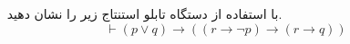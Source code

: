 ~
با استفاده از دستگاه تابلو استنتاج زیر را نشان دهید.
\[ \vdash (p \vee q) \rightarrow ((r \rightarrow \neg p) \rightarrow (r \rightarrow q)) \]